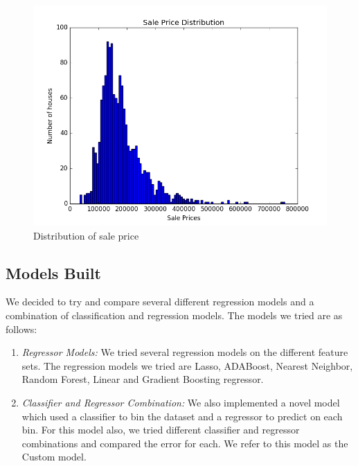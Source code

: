 \documentclass[conference,compsoc]{IEEEtran}
\begin{document}
\begin{figure}[!h]
  \includegraphics[width=\linewidth,natwidth=800,natheight=600]{Bins_100.png}
  \caption{Distribution of sale price}
  \label{fig:SalePriceDist}
\end{figure}

\subsection{Models Built}
\par
We decided to try and compare several different regression models and a combination of classification and regression models. The models we tried are as follows:

\begin{enumerate}  
\par
\item \textit{Regressor Models: } We tried several regression models on the different feature sets. The regression models we tried are Lasso, ADABoost, Nearest Neighbor, Random Forest, Linear and Gradient Boosting regressor.

\par
\item\textit{Classifier and Regressor Combination: } We also implemented a novel model which used a classifier to bin the dataset and a regressor to predict on each bin. For this model also, we tried different classifier and regressor combinations and compared the error for each. We refer to this model as the Custom model.

\par 
\end{enumerate} 
\end{document}
